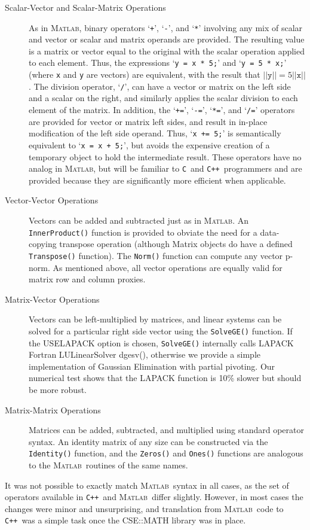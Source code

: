 \documentclass[12pt]{article}
\newcommand{\matlab}{\textsc{Matlab}}
\newcommand{\cpp}{\texttt{C++}}%
\newcommand{\clang}{\texttt{C}}%
\newcommand{\api}[1]{\texttt{#1}}
\newcommand{\srccode}[1]{\texttt{#1}}
\begin{document}
\begin{description}
  \item[Scalar-Vector and Scalar-Matrix Operations] As in \matlab,
  binary operators `\srccode{+}', `\srccode{-}', and `\srccode{*}'
  involving any mix of scalar and vector or scalar and matrix operands
  are provided.  The resulting value is a matrix or vector equal to
  the original with the scalar operation applied to each element.
  Thus, the expressions `\srccode{y = x * 5;}' and `\srccode{y = 5 *
  x;}' (where \srccode{x} and \srccode{y} are vectors) are equivalent,
  with the result that $||\texttt{y}|| = 5 ||\texttt{x}||$.  The division
  operator, `\srccode{/}', can have a vector or matrix on the left
  side and a scalar on the right, and similarly applies the scalar
  division to each element of the matrix.  In addition, the
  `\srccode{+=}', `\srccode{-=}', `\srccode{*=}', and `\srccode{/=}'
  operators are provided for vector or matrix left sides, and result
  in in-place modification of the left side operand.  Thus,
  `\srccode{x += 5;}' is semantically equivalent to `\srccode{x = x +
  5;}', but avoids the expensive creation of a temporary object to
  hold the intermediate result.  These operators have no analog in
  \matlab, but will be familiar to \clang\  and \cpp\ programmers and
  are provided because they are significantly more efficient when
  applicable.

  \item[Vector-Vector Operations] Vectors can be added and subtracted
  just as in \matlab.  An \api{InnerProduct()} function is provided to
  obviate the need for a data-copying transpose operation (although
  Matrix objects do have a defined \api{Transpose()} function).  The
  \api{Norm()} function can compute any vector p-norm. As mentioned above, all
  vector operations are equally valid for matrix row and column proxies.

  \item[Matrix-Vector Operations] Vectors can be left-multiplied by
  matrices, and linear systems can be solved for a particular right
  side vector using the \api{SolveGE()} function. If the USELAPACK option is
  chosen, \api{SolveGE()} internally calls LAPACK Fortran LULinearSolver
  dgesv(), otherwise we provide a simple implementation of Gaussian
  Elimination with partial pivoting. Our numerical test shows that the
  LAPACK function is 10\% slower but should be more robust.

  \item[Matrix-Matrix Operations] Matrices can be added, subtracted,
  and multiplied using standard operator syntax.  An identity matrix
  of any size can be constructed via the \api{Identity()} function,
  and the \api{Zeros()} and \api{Ones()} functions are analogous to
  the \matlab\ routines of the same names.

\end{description}
It was not possible to exactly match \matlab\ syntax in all cases, as
the set of operators available in \cpp\ and \matlab\ differ
slightly. However, in most cases the changes were minor and
unsurprising, and translation from \matlab\ code to \cpp\ was a
simple task once the CSE::MATH library was in place.
\end{document}

